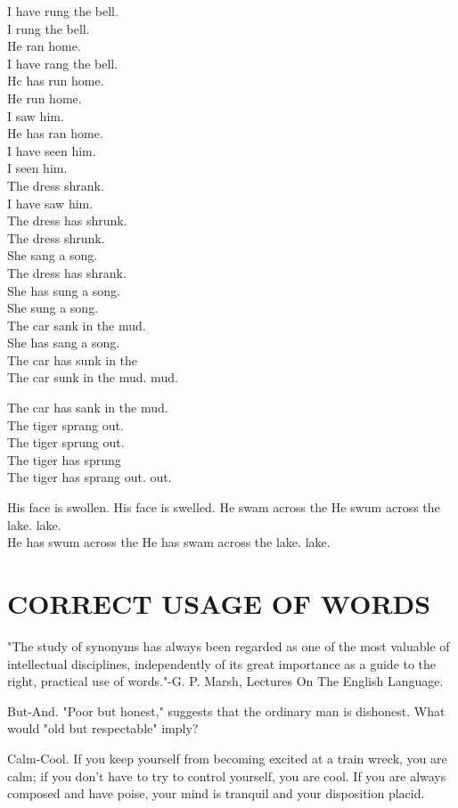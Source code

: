\documentclass[10pt]{article}
\begin{document}
I have rung the bell.\\
I rung the bell.\\
He ran home.\\
I have rang the bell.\\
Hc has run home.\\
He run home.\\
I saw him.\\
He has ran home.\\
I have seen him.\\
I seen him.\\
The dress shrank.\\
I have saw him.\\
The dress has shrunk.\\
The dress shrunk.\\
She sang a song.\\
The dress has shrank.\\
She has sung a song.\\
She sung a song.\\
The car sank in the mud.\\
She has sang a song.\\
The car has sunk in the\\
The car sunk in the mud. mud.

The car has sank in the mud.\\
The tiger sprang out.\\
The tiger sprung out.\\
The tiger has sprung\\
The tiger has sprang out. out.

His face is swollen. His face is swelled. He swam across the He swum across the lake. lake.\\
He has swum across the He has swam across the lake. lake.

\section*{CORRECT USAGE OF WORDS}
"The study of synonyms has always been regarded as one of the most valuable of intellectual disciplines, independently of its great importance as a guide to the right, practical use of words."-G. P. Marsh, Lectures On The English Language.

But-And. "Poor but honest," suggests that the ordinary man is dishonest. What would "old but respectable" imply?

Calm-Cool. If you keep yourself from becoming excited at a train wreck, you are calm; if you don't have to try to control yourself, you are cool. If you are always composed and have poise, your mind is tranquil and your disposition placid.
\end{document}

